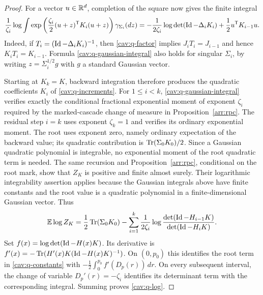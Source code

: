 \begin{proof}
For a vector $u\in\mathbb R^d$, completion of the square now gives the
finite integral
\begin{equation}\label{cav:q-gaussian-integral}
 \frac1{\zeta_i}\log\int
       \exp\left(\frac{\zeta_i}{2}
                    (u+z)^{\mathsf T}K_i(u+z)\right)
                    \gamma_{\Sigma_i}(dz)
 =-\frac1{2\zeta_i}\log\det(\operatorname{Id}-\Delta_iK_i)
       +\frac12u^{\mathsf T}K_{i-1}u.
\end{equation}
Indeed, if $T_i=(\operatorname{Id}-\Delta_iK_i)^{-1}$, then
\eqref{cav:q-factor} implies $J_iT_i=J_{i-1}$ and hence
$K_iT_i=K_{i-1}$.  Formula \eqref{cav:q-gaussian-integral} also
holds for singular $\Sigma_i$, by writing $z=\Sigma_i^{1/2}g$
with $g$ a standard Gaussian vector.

Starting at $K_k=K$, backward integration therefore produces the
quadratic coefficients $K_i$ of \eqref{cav:q-increments}.
For $1\leq i<k$, \eqref{cav:q-gaussian-integral} verifies exactly
the conditional fractional exponential moment of exponent $\zeta_i$
required by the marked-cascade change of measure in Proposition~\ref{arr:rpc}.
The residual step $i=k$ uses exponent $\zeta_k=1$ and verifies its
ordinary exponential moment.  The root uses exponent zero, namely
ordinary expectation of the backward value; its quadratic contribution
is $\operatorname{Tr}(\Sigma_0K_0)/2$.  Since a Gaussian quadratic polynomial is
integrable, no exponential moment of the root quadratic term is needed.
The same recursion and Proposition~\ref{arr:rpc}, conditional on the root
mark, show that $Z_K$ is positive and finite almost surely.  Their
logarithmic integrability assertion applies because the Gaussian
integrals above have finite constants and the root value is a quadratic
polynomial in a finite-dimensional Gaussian vector.  Thus
\begin{equation}\label{cav:q-constants}
 \mathbb E\log Z_K
 =\frac12\operatorname{Tr}(\Sigma_0K_0)
 -\sum_{i=1}^k\frac1{2\zeta_i}
   \log\frac{\det(\operatorname{Id}-H_{i-1}K)}{\det(\operatorname{Id}-H_iK)}.
\end{equation}
Set $f(x)=\log\det(\operatorname{Id}-H(x)K)$.  Its derivative is
$f'(x)=-\operatorname{Tr}(H'(x)K(\operatorname{Id}-H(x)K)^{-1})$.
On $(0,p_0)$ this identifies the root term in
\eqref{cav:q-constants} with $-\frac12\int_0^{p_0}f'(D_p(r))\,dr$.
On every subsequent interval, the change of variable
$D_p'(r)=-\zeta_i$ identifies its determinant term with the
corresponding integral.  Summing proves \eqref{cav:q-log}.


\end{proof}
